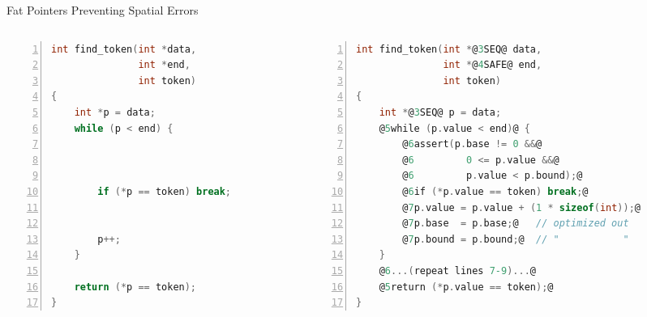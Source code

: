 \documentclass[aspectratio=169]{beamer}
\begin{document}
\begin{frame}[fragile]{Fat Pointers Preventing Spatial Errors}
    \begin{columns}[T]
      \begin{column}{0.44\textwidth}
\begin{lstlisting}[language=C,numbers=left,mathescape,basicstyle={\scriptsize\ttfamily}]
int find_token(int *data,
               int *end,
               int token)
{
    int *p = data;
    while (p < end) {



        if (*p == token) break;


        p++;
    }

    return (*p == token);
}
\end{lstlisting}
\end{column}

\pause

\begin{column}{0.56\textwidth}

\begin{lstlisting}[language=C,numbers=left,mathescape,basicstyle={\scriptsize\ttfamily},
    moredelim={**[is][\btHL<3>]{@3}{@}},
    moredelim={**[is][{\btHL<4>}]{@4}{@}},
    moredelim={**[is][{\btHL<5>}]{@5}{@}},
    moredelim={**[is][{\btHL<6>}]{@6}{@}},
    moredelim={**[is][{\btHL<7>}]{@7}{@}},
    moredelim={**[is][{\btHL<8>}]{@8}{@}}
]
int find_token(int *@3SEQ@ data,
               int *@4SAFE@ end,
               int token)
{
    int *@3SEQ@ p = data;
    @5while (p.value < end)@ {
        @6assert(p.base != 0 &&@
        @6         0 <= p.value &&@
        @6         p.value < p.bound);@
        @6if (*p.value == token) break;@
        @7p.value = p.value + (1 * sizeof(int));@
        @7p.base  = p.base;@   // optimized out
        @7p.bound = p.bound;@  // "           "
    }
    @6...(repeat lines 7-9)...@
    @5return (*p.value == token);@
}
\end{lstlisting}
\end{column}

\end{columns}
\end{frame}
\end{document}
